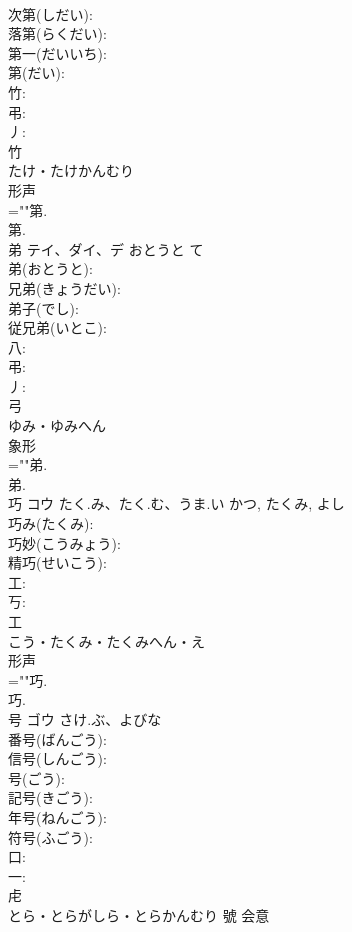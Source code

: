 \documentclass[8pt]{extreport}
\begin{document}
\begin{CJK}{UTF8}{min}
\\	次第(しだい): 
\\	落第(らくだい): 
\\	第一(だいいち): 
\\	第(だい): 
\\	竹: 
\\	弔: 
\\	丿: 
\\	竹	
\\	たけ・たけかんむり	
\\	形声 
\\	=""第.
\\	第.
\\	弟	テイ、ダイ、デ	おとうと	て	
\\	弟(おとうと): 
\\	兄弟(きょうだい): 
\\	弟子(でし): 
\\	従兄弟(いとこ): 
\\	八: 
\\	弔: 
\\	丿: 
\\	弓	
\\	ゆみ・ゆみへん	
\\	象形 
\\	=""弟.
\\	弟.
\\	巧	コウ	たく.み、たく.む、うま.い	かつ, たくみ, よし	
\\	巧み(たくみ): 
\\	巧妙(こうみょう): 
\\	精巧(せいこう): 
\\	工: 
\\	丂: 
\\	工	
\\	こう・たくみ・たくみへん・え	
\\	形声 
\\	=""巧.
\\	巧.
\\	号	ゴウ	さけ.ぶ、よびな		
\\	番号(ばんごう): 
\\	信号(しんごう): 
\\	号(ごう): 
\\	記号(きごう): 
\\	年号(ねんごう): 
\\	符号(ふごう): 
\\	口: 
\\	一: 
\\	虍	
\\	とら・とらがしら・とらかんむり	號	会意 

\end{CJK}
\end{document}
